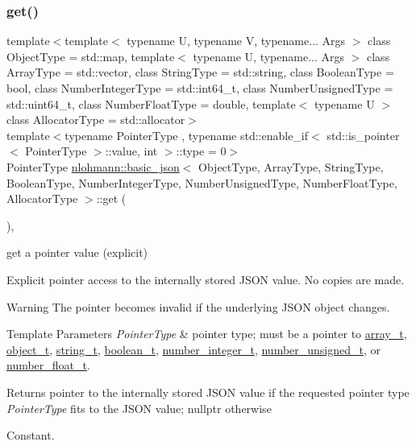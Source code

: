 \subsubsection{\texorpdfstring{get()}{get()}\hspace{0.1cm}{\footnotesize\ttfamily [2/3]}}
{\footnotesize\ttfamily template$<$template$<$ typename U, typename V, typename... Args $>$ class Object\+Type = std\+::map, template$<$ typename U, typename... Args $>$ class Array\+Type = std\+::vector, class String\+Type  = std\+::string, class Boolean\+Type  = bool, class Number\+Integer\+Type  = std\+::int64\+\_\+t, class Number\+Unsigned\+Type  = std\+::uint64\+\_\+t, class Number\+Float\+Type  = double, template$<$ typename U $>$ class Allocator\+Type = std\+::allocator$>$ \\
template$<$typename Pointer\+Type , typename std\+::enable\+\_\+if$<$ std\+::is\+\_\+pointer$<$ Pointer\+Type $>$\+::value, int $>$\+::type  = 0$>$ \\
Pointer\+Type \hyperlink{classnlohmann_1_1basic__json}{nlohmann\+::basic\+\_\+json}$<$ Object\+Type, Array\+Type, String\+Type, Boolean\+Type, Number\+Integer\+Type, Number\+Unsigned\+Type, Number\+Float\+Type, Allocator\+Type $>$\+::get (\begin{DoxyParamCaption}{ }\end{DoxyParamCaption})\hspace{0.3cm}{\ttfamily [inline]}, {\ttfamily [noexcept]}}



get a pointer value (explicit) 

Explicit pointer access to the internally stored J\+S\+ON value. No copies are made.

\begin{DoxyWarning}{Warning}
The pointer becomes invalid if the underlying J\+S\+ON object changes.
\end{DoxyWarning}

\begin{DoxyTemplParams}{Template Parameters}
{\em Pointer\+Type} & pointer type; must be a pointer to \hyperlink{classnlohmann_1_1basic__json_ab00b882d39306d663c23dab110f5cae0}{array\+\_\+t}, \hyperlink{classnlohmann_1_1basic__json_a0ac9894c9de8dc551cf2e5f1c605537f}{object\+\_\+t}, \hyperlink{classnlohmann_1_1basic__json_ab63e618bbb0371042b1bec17f5891f42}{string\+\_\+t}, \hyperlink{classnlohmann_1_1basic__json_af3bc3e83aa162d7ba4df16a949872723}{boolean\+\_\+t}, \hyperlink{classnlohmann_1_1basic__json_ac4b10b2364f26ce47bdb9a413ff04a59}{number\+\_\+integer\+\_\+t}, \hyperlink{classnlohmann_1_1basic__json_a60a04166c122072ab11eaf9845d9cd1d}{number\+\_\+unsigned\+\_\+t}, or \hyperlink{classnlohmann_1_1basic__json_a74a0013e847fdc574b48f931f0e757e1}{number\+\_\+float\+\_\+t}.\\
\hline
\end{DoxyTemplParams}
\begin{DoxyReturn}{Returns}
pointer to the internally stored J\+S\+ON value if the requested pointer type {\itshape Pointer\+Type} fits to the J\+S\+ON value; {\ttfamily nullptr} otherwise
\end{DoxyReturn}
Constant.


